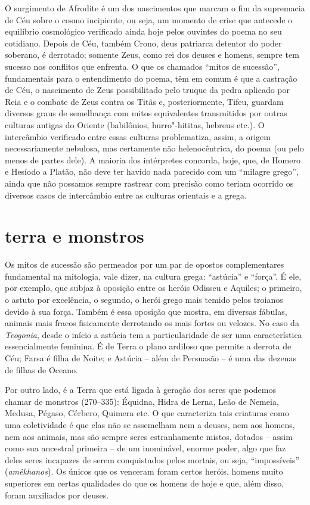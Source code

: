 O surgimento de Afrodite é um dos nascimentos que marcam o fim da supremacia de
Céu sobre o cosmo incipiente, ou seja, um momento de crise que antecede o
equilíbrio cosmológico verificado ainda hoje pelos ouvintes do poema no seu
cotidiano. Depois de Céu, também Crono, deus patriarca detentor do poder
soberano, é derrotado; somente Zeus, como rei dos deuses e homens, sempre tem
sucesso nos conflitos que enfrenta. O que os chamados “mitos de sucessão”,
fundamentais para o entendimento do poema, têm em comum é que a castração de
Céu, o nascimento de Zeus possibilitado pelo truque da pedra aplicado por Reia
e o combate de Zeus contra os Titãs e, posteriormente, Tifeu, guardam diversos
graus de semelhança com mitos equivalentes transmitidos por outras culturas
antigas do Oriente (babilônios, hurro"-hititas, hebreus etc.). O intercâmbio
verificado entre essas culturas problematiza, assim, a origem necessariamente
nebulosa, mas certamente não helenocêntrica, do poema (ou pelo menos de partes
dele). A maioria dos intérpretes concorda, hoje, que, de Homero e Hesíodo a
Platão, não deve ter havido nada parecido com um “milagre grego”, ainda que não
possamos sempre rastrear com precisão como teriam ocorrido os diversos casos de
intercâmbio entre as culturas orientais e a grega.

\section{terra e monstros}

Os mitos de sucessão são permeados por um par de opostos complementares
fundamental na mitologia, vale dizer, na cultura grega: “astúcia” e “força”. É
ele, por exemplo, que subjaz à oposição entre os heróis Odisseu e Aquiles; o
primeiro, o astuto por excelência, o segundo, o herói grego mais temido pelos
troianos devido à sua força. Também é essa oposição que mostra, em diversas
fábulas, animais mais fracos fisicamente derrotando os mais fortes ou velozes.
No caso da \textit{Teogonia}, desde o início a astúcia tem a particularidade de
ser uma característica essencialmente feminina. É de Terra o plano ardiloso que
permite a derrota de Céu; Farsa é filha de Noite; e Astúcia – além de Persuasão
– é uma das dezenas de filhas de Oceano.

Por outro lado, é a Terra que está ligada à geração dos seres que podemos
chamar de monstros (270--335): Équidna, Hidra de Lerna, Leão de Nemeia, Medusa,
Pégaso, Cérbero, Quimera etc. O que caracteriza tais criaturas como uma
coletividade é que elas não se assemelham nem a deuses, nem aos homens, nem aos
animais, mas são sempre seres estranhamente mistos, dotados – assim como sua
ancestral primeira – de um inominável, enorme poder, algo que faz deles seres
incapazes de serem conquistados pelos mortais, ou seja, “impossíveis”
(\textit{amêkhanos}). Os únicos que os venceram foram certos heróis, homens
muito superiores em certas qualidades do que os homens de hoje e que, além
disso, foram auxiliados por deuses.

